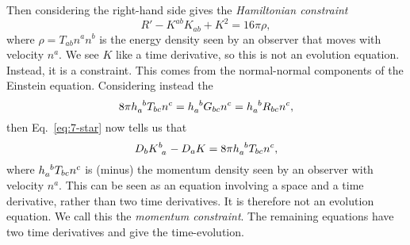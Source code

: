 Then considering the right-hand side gives the \emph{Hamiltonian constraint}
\begin{equation}
  R' - K^{ab} K_{ab} + K^2 = 16 \pi \rho,
\end{equation}
where $\rho = T_{ab} n^{a} n^{b}$ is the energy density seen by an observer that moves with velocity $n^{a}$.
We see $K$ like a time derivative, so this is not an evolution equation. Instead, it is a constraint.
This comes from the normal-normal components of the Einstein equation.
Considering instead the 
\begin{equation}
  8 \pi h\indices{_{a}^{b}} T_{bc} n^{c} = h\indices{_{a}^{b}} G_{bc} n^{c} = h\indices{_{a}^{b}} R_{bc} n^{c},
\end{equation}
then Eq.~\eqref{eq:7-star} now tells us that
\begin{equation}
  D_b K\indices{^{b}_{a}} - D_{a} K = 8 \pi h\indices{_{a}^{b}} T_{bc} n^c,
\end{equation}
where $h\indices{_{a}^{b}} T_{bc} n^{c}$ is (minus) the momentum density seen by an observer with velocity $n^a$.
This can be seen as an equation involving a space and a time derivative, rather than two time derivatives. It is therefore not an evolution equation. We call this the \emph{momentum constraint}.
The remaining equations have two time derivatives and give the time-evolution.
